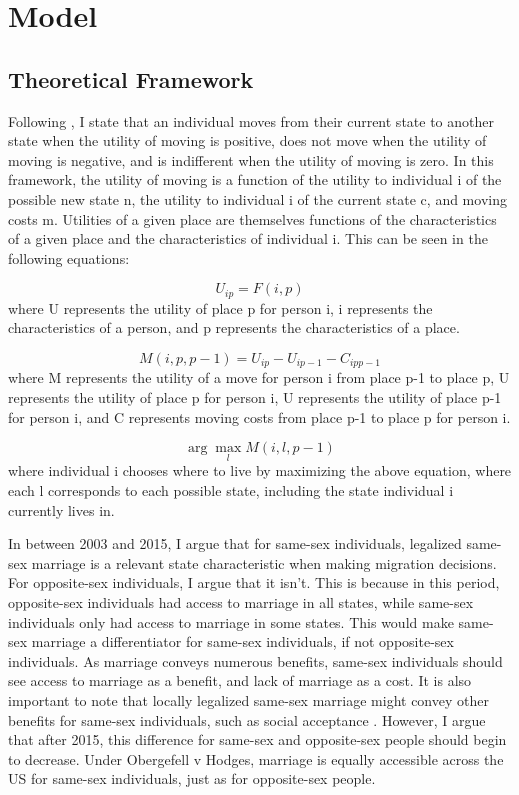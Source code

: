 \documentclass[12pt,letterpaper]{article}
\begin{document}
\section{Model}
\subsection{Theoretical Framework}
Following \citet{1, 12, 18}, I state that an individual moves from their current state to another state when the utility of moving is positive, does not move when the utility of moving is negative, and is indifferent when the utility of moving is zero. In this framework, the utility of moving is a function of the utility to individual i of the possible new state n, the utility to individual i of the current state c, and moving costs m. Utilities of a given place are themselves functions of the characteristics of a given place and the characteristics of individual i. This can be seen in the following equations: 

\begin{equation}
U_{ip} = F(i,p)
\end{equation}
where U represents the utility of place p for person i, i represents the characteristics of a person, and p represents the characteristics of a place. 

\begin{equation}
M(i, p, p-1) = U_{ip} - U_{ip-1} - C_{ipp-1}
\end{equation}
where M represents the utility of a move for person i from place p-1 to place p, U represents the utility of place p for person i, U represents the utility of place p-1 for person i, and C represents moving costs from place p-1 to place p for person i.

\begin{equation}
\arg\max_{l} M(i, l, p-1)
\end{equation}
where individual i chooses where to live by maximizing the above equation, where each l corresponds to each possible state, including the state individual i currently lives in.
\newline

In between 2003 and 2015, I argue that for same-sex individuals, legalized same-sex marriage is a relevant state characteristic when making migration decisions. For opposite-sex individuals, I argue that it isn’t. This is because in this period, opposite-sex individuals had access to marriage in all states, while same-sex individuals only had access to marriage in some states. This would make same-sex marriage a differentiator for same-sex individuals, if not opposite-sex individuals. As marriage conveys numerous benefits, same-sex individuals should see access to marriage as a benefit, and lack of marriage as a cost. It is also important to note that locally legalized same-sex marriage might convey other benefits for same-sex individuals, such as social acceptance \citep{12}. However, I argue that after 2015, this difference for same-sex and opposite-sex people should begin to decrease. Under Obergefell v Hodges, marriage is equally accessible across the US for same-sex individuals, just as for opposite-sex people. 
\end{document}
